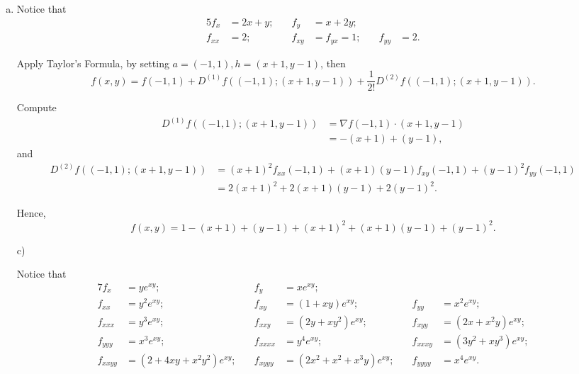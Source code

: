 \begin{Exercise}
\begin{enumerate}[a)]
\item
\begin{solution}
Notice that
\begin{alignat*}{5}
f_x &= 2x+y;&\quad f_y &= x+2y; &\quad &\quad\\
f_{x x} &= 2;&\quad f_{x y} &= f_{y x} = 1;&\quad f_{y y} &= 2.
\end{alignat*}

Apply Taylor's Formula, by setting $a=(-1,1), h=(x+1,y-1)$, then
$$
f(x,y) = f(-1,1) + D^{(1)} f\left( (-1,1);(x+1,y-1)\right) + \frac{1}{2!} D^{(2)} f\left( (-1,1);(x+1,y-1) \right).
$$

Compute
\begin{align*}
D^{(1)} f\left( (-1,1);(x+1,y-1)\right)
&= \nabla f(-1,1)\cdot(x+1,y-1) \\
&= -(x+1)+(y-1),
\end{align*}
and
\begin{align*}
D^{(2)} f\left( (-1,1);(x+1,y-1) \right)
&= (x+1)^2 f_{x x}(-1, 1) + (x+1)(y-1) f_{x y}(-1,1) + (y-1)^2 f_{y y}(-1,1) \\
&= 2(x+1)^2 + 2(x+1)(y-1) + 2(y-1)^2.
\end{align*}

Hence,
$$
f(x,y) = 1-(x+1)+(y-1)+(x+1)^2+(x+1)(y-1)+(y-1)^2.
$$
\end{solution}

\item [c)]
\begin{solution}
Notice that
\begin{alignat*}{7}
f_x &= y e^{x y}; &\quad f_y &= x e^{x y};\\
f_{x x} &= y^2 e^{x y}; &\quad f_{x y} &= (1+x y)e^{x y}; &\quad f_{y y} &= x^2 e^{x y}; \\
f_{x x x} &= y^3 e^{x y}; &\quad f_{x x y} &= (2y+x y^2)e^{x y}; &\quad f_{x y y} &= (2x+x^2 y)e^{x y}; \\
f_{y y y} &= x^3 e^{x y}; &\quad f_{x x x x} &= y^4 e^{x y}; &\quad f_{x x x y} &= (3y^2+x y^3)e^{x y}; \\
f_{x x y y} &= (2+4x y+x^2 y^2)e^{x y}; &\quad f_{x y y y} &= (2x^2+x^2+x^3 y)e^{x y}; &\quad f_{y y y y} &= x^4 e^{x y}.
\end{alignat*}


\end{solution}
\end{enumerate}
\end{Exercise}

